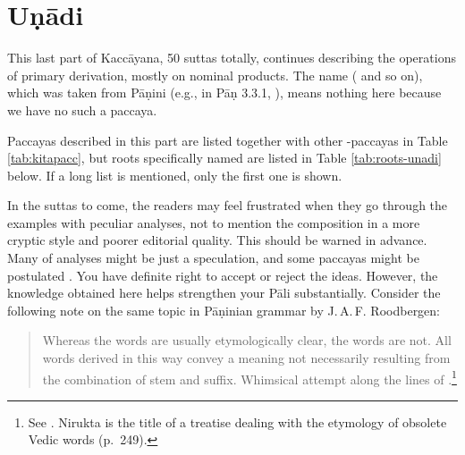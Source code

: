 \chapter{Uṇādi}

This last part of Kaccāyana, 50 suttas totally, continues describing the operations of primary derivation, mostly on nominal products. The name  ( and so on), which was taken from Pāṇini (e.g., in Pāṇ 3.3.1, ), means nothing here because we have no such a paccaya.

Paccayas described in this part are listed together with other -paccayas in Table \ref{tab:kitapacc}, but roots specifically named are listed in Table \ref{tab:roots-unadi} below. If a long list is mentioned, only the first one is shown.

In the suttas to come, the readers may feel frustrated when they go through the examples with peculiar analyses, not to mention the composition in a more cryptic style and poorer editorial quality. This should be warned in advance. Many of analyses might be just a speculation, and some paccayas might be postulated . You have definite right to accept or reject the ideas. However, the knowledge obtained here helps strengthen your Pāli substantially. Consider the following note on the same topic in Pāṇinian grammar by J.\,A.\,F. Roodbergen:

\begin{quotation}
Whereas the  words are usually etymologically clear, the  words are not. All words derived in this way convey a meaning not necessarily resulting from the combination of stem and suffix. Whimsical attempt along the lines of .\footnote{See \citealp[p.~100]{roodbergen:gramdict}. Nirukta is the title of a treatise dealing with the etymology of obsolete Vedic words (p.~249).}
\end{quotation}

